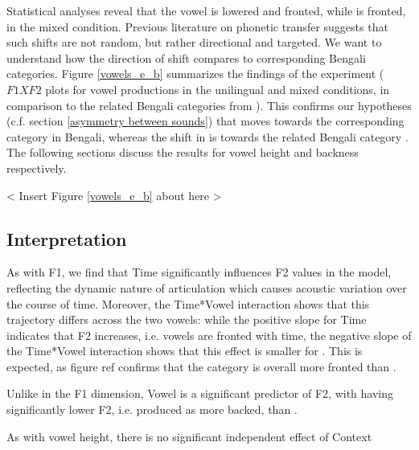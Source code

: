 \documentclass[12 pt]{article}
\newcommand{\nt}[1]{\textipa{[#1]}} %
\begin{document}
Statistical analyses reveal that the vowel \nt{2} is lowered and fronted, while \nt{\ae} is fronted, in the mixed condition.  Previous literature on phonetic transfer suggests that such shifts are not random, but rather directional and targeted. We want to understand how the direction of shift compares to corresponding Bengali categories. Figure \ref{vowels_e_b} summarizes the findings of the experiment ($F1XF2$ plots for vowel productions in the unilingual and mixed conditions, in comparison to the related Bengali categories from \cite{dutta2021}). This confirms our hypotheses (c.f. section \ref{asymmetry between sounds}) that \nt{\ae} moves towards the corresponding \nt{\ae} category in Bengali, whereas the shift in \nt{2} is towards the related Bengali category \nt{a:}. The following sections discuss the results for vowel height and backness respectively.

< Insert Figure \ref{vowels_e_b} about here >

\subsection*{Interpretation}

As with F1, we find that Time significantly influences F2 values in the model, reflecting the dynamic nature of articulation which causes acoustic variation over the course of time. Moreover, the Time*Vowel interaction shows that this trajectory differs across the two vowels: while the positive slope for Time indicates that F2 increases, i.e. vowels are fronted with time, the negative slope of the Time*Vowel interaction shows that this effect is smaller for \nt{2}. This is expected, as figure \alert{ref} confirms that the category \nt{\ae} is overall more fronted than \nt{2}. 

Unlike in the F1 dimension, Vowel is a significant predictor of F2, with \nt{2} having significantly lower F2, i.e. produced as more backed, than \nt{\ae}.

As with vowel height, there is no significant independent effect of Context
 
\end{document}
